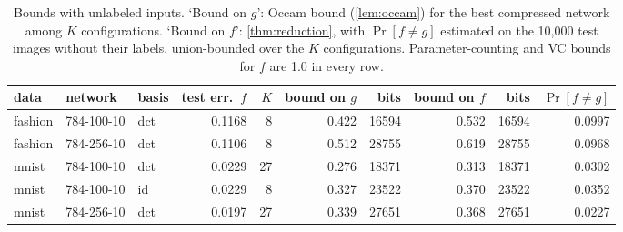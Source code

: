 \begin{table}[t]
\centering\small
\begin{adjustbox}{max width=\linewidth}\begin{tabular}{l l l r r r r r r r}
\toprule
data & network & basis & test err.\ $f$ & $K$ & bound on $g$ & bits & bound on $f$ & bits & $\Pr[f\ne g]$ \\
\midrule
fashion & 784-100-10 & dct & 0.1168 & 8 & 0.422 & 16594 & 0.532 & 16594 & 0.0997 \\
fashion & 784-256-10 & dct & 0.1106 & 8 & 0.512 & 28755 & 0.619 & 28755 & 0.0968 \\
mnist & 784-100-10 & dct & 0.0229 & 27 & 0.276 & 18371 & 0.313 & 18371 & 0.0302 \\
mnist & 784-100-10 & id & 0.0229 & 8 & 0.327 & 23522 & 0.370 & 23522 & 0.0352 \\
mnist & 784-256-10 & dct & 0.0197 & 27 & 0.339 & 27651 & 0.368 & 27651 & 0.0227 \\
\bottomrule
\end{tabular}\end{adjustbox}
\caption{Bounds with unlabeled inputs. `Bound on $g$': Occam bound (\cref{lem:occam}) for the best compressed network among $K$ configurations. `Bound on $f$': \cref{thm:reduction}, with $\Pr[f\ne g]$ estimated on the 10{,}000 test images without their labels, union-bounded over the $K$ configurations. Parameter-counting and VC bounds for $f$ are 1.0 in every row.}\label{tab:t2}
\end{table}
